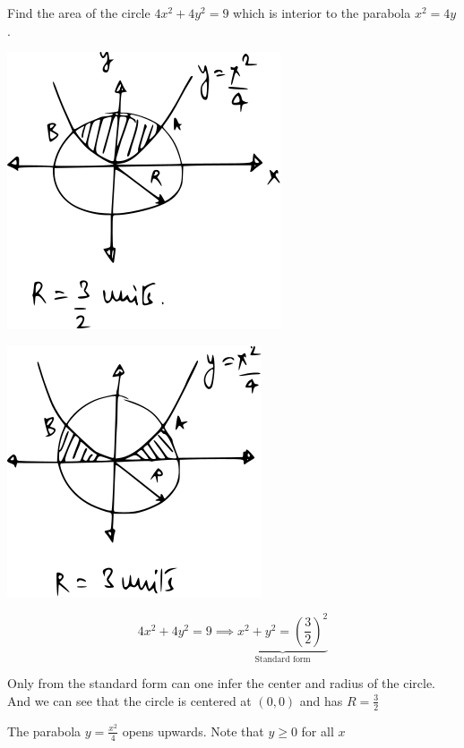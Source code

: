 \documentclass[14pt,fleqn]{extarticle}
\begin{document}
Find the area of the circle $4x^2+4y^2=9$ 
which is interior to the parabola $x^2=4y$.
%

\newcard

\begin{center}
\includegraphics[scale=1.3]{img_prefab-1.svg} 
\end{center} 

\newcard

\begin{center}
\includegraphics[scale=1.3]{img_prefab-2.svg} 
\end{center} 

\newcard

\[ 4x^2 + 4y^2 = 9 \implies \underbrace{x^2 + y^2 = \left(\frac{3}{2} \right)^2}_{\text{Standard form}} \]

Only from the standard form can one infer the center and radius of the circle. And we can see that the circle is centered at $(0,0)$ and has $R = \frac{3}{2}$ \newline 

The parabola $y = \frac{x^2}{4}$ opens upwards. Note that $ y\geq 0$ for all $x$ \newline 
\end{document}
